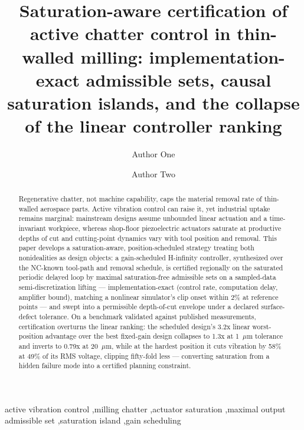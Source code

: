 \documentclass[preprint,12pt]{elsarticle}
\begin{document}
\begin{frontmatter}

\title{Saturation-aware certification of active chatter control in
thin-walled milling: implementation-exact admissible sets, causal
saturation islands, and the collapse of the linear controller ranking}

\author{Author One}
\author{Author Two}

\begin{abstract}
Regenerative chatter, not machine capability, caps the material
removal rate of thin-walled aerospace parts. Active vibration control
can raise it, yet industrial uptake remains marginal: mainstream
designs assume unbounded linear actuation and a time-invariant
workpiece, whereas shop-floor piezoelectric actuators saturate at
productive depths of cut and cutting-point dynamics vary with tool
position and removal. This paper develops a saturation-aware,
position-scheduled strategy treating both nonidealities as design
objects: a gain-scheduled H-infinity controller, synthesized over the
NC-known tool-path and removal schedule, is certified regionally on
the saturated periodic delayed loop by maximal saturation-free
admissible sets on a sampled-data semi-discretization lifting ---
implementation-exact (control rate, computation delay, amplifier
bound), matching a nonlinear simulator's clip onset within 2\% at
reference points --- and swept into a permissible depth-of-cut
envelope under a declared surface-defect tolerance. On a benchmark
validated against published measurements, certification overturns the
linear ranking: the scheduled design's 3.2x linear worst-position
advantage over the best fixed-gain design collapses to 1.3x at
1~$\mu$m tolerance and inverts to 0.79x at 20~$\mu$m, while at the
hardest position it cuts vibration by 58\% at 49\% of its RMS
voltage, clipping fifty-fold less --- converting saturation from a
hidden failure mode into a certified planning constraint.
\end{abstract}

\begin{keyword}
active vibration control \sep milling chatter \sep actuator
saturation \sep maximal output admissible set \sep saturation island
\sep gain scheduling
\end{keyword}

\end{frontmatter}

\end{document}
